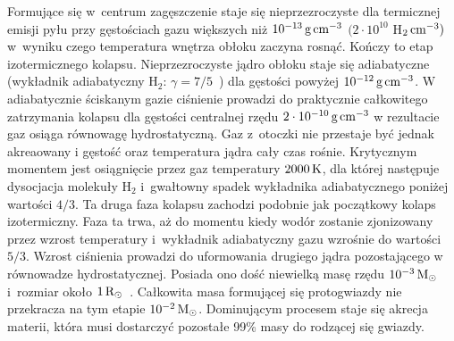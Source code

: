 \par Formujące się w~centrum zagęszczenie staje się nieprzezroczyste dla
termicznej emisji pyłu przy gęstościach gazu większych niż $10^{-13}\hbox{$\thinspace\textrm{g}$}\hbox{$\thinspace\textrm{cm}$}^{-3}$
$(2\cdot10^{10}$ H$_2\hbox{$\thinspace\textrm{cm}$}^{-3})$~\cite{L69} w~wyniku czego temperatura wnętrza
obłoku zaczyna rosnąć. Kończy to etap izotermicznego kolapsu. Nieprzezroczyste
jądro obłoku staje się adiabatyczne (wykładnik adiabatyczny H$_2$: $\gamma =
7/5$~\cite{L69}) dla gęstości powyżej $10^{-12}\hbox{$\thinspace\textrm{g}$}\hbox{$\thinspace\textrm{cm}$}^{-3}$. W adiabatycznie
ściskanym gazie ciśnienie prowadzi do praktycznie
całkowitego zatrzymania kolapsu dla gęstości centralnej rzędu $2\cdot
10^{-10}\hbox{$\thinspace\textrm{g}$}\hbox{$\thinspace\textrm{cm}$}^{-3}$ w rezultacie gaz  osiąga równowagę hydrostatyczną. Gaz
z~otoczki nie przestaje być jednak akreaowany i gęstość oraz temperatura jądra
cały czas rośnie. Krytycznym momentem jest osiągnięcie przez gaz temperatury
$2000\hbox{$\thinspace\textrm{K}$}$, dla której następuje dysocjacja molekuły H$_2$ i~gwałtowny spadek
wykładnika adiabatycznego poniżej wartości $4/3$. Ta druga faza kolapsu zachodzi
podobnie jak początkowy kolaps izotermiczny. Faza ta trwa, aż do momentu kiedy
wodór zostanie zjonizowany przez wzrost temperatury i~wykładnik adiabatyczny
gazu wzrośnie do wartości $5/3$.  Wzrost ciśnienia prowadzi do uformowania
drugiego jądra pozostającego w równowadze hydrostatycznej. Posiada ono dość
niewielką masę rzędu $10^{-3}\hbox{$\mathrm{\thinspace M_{\odot}}$}$ i~rozmiar około $1\hbox{$\mathrm{\thinspace R_{\odot}}$}$~\cite{MI00}.
Całkowita masa formującej się protogwiazdy nie przekracza na tym etapie
$10^{-2}\hbox{$\mathrm{\thinspace M_{\odot}}$}$.  Dominującym procesem staje się akrecja materii, która musi
dostarczyć pozostałe 99\% masy do rodzącej się gwiazdy. 

